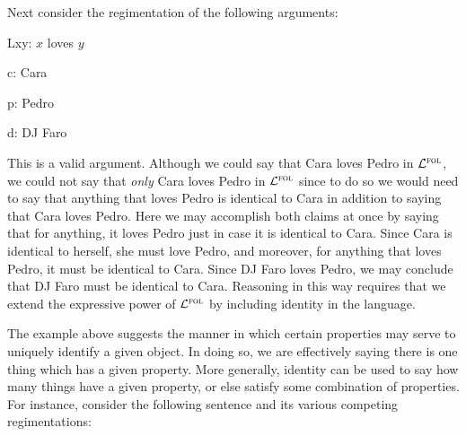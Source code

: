
Next consider the regimentation of the following arguments:

\begin{multicols}{2}

  \begin{ekey}
    \item[Lxy:] $x$ loves $y$
    \item[c:] Cara
    \item[p:] Pedro
    \item[d:] DJ Faro
  \end{ekey}

  \vfill
  \strut
  \columnbreak

  \begin{earg}
  \end{earg}

  \begin{earg}
  \end{earg}

\end{multicols}

This is a valid argument.
Although we could say that Cara loves Pedro in $\mathcal{L}^{\textsc{fol}}$, we could not say that \textit{only} Cara loves Pedro in $\mathcal{L}^{\textsc{fol}}$ since to do so we would need to say that anything that loves Pedro is identical to Cara in addition to saying that Cara loves Pedro.
Here we may accomplish both claims at once by saying that for anything, it loves Pedro just in case it is identical to Cara.
Since Cara is identical to herself, she must love Pedro, and moreover, for anything that loves Pedro, it must be identical to Cara.
Since DJ Faro loves Pedro, we may conclude that DJ Faro must be identical to Cara.
Reasoning in this way requires that we extend the expressive power of $\mathcal{L}^{\textsc{fol}}$ by including identity in the language.

The example above suggests the manner in which certain properties may serve to uniquely identify a given object.
In doing so, we are effectively saying there is one thing which has a given property.
More generally, identity can be used to say how many things have a given property, or else satisfy some combination of properties.
For instance, consider the following sentence and its various competing regimentations:

